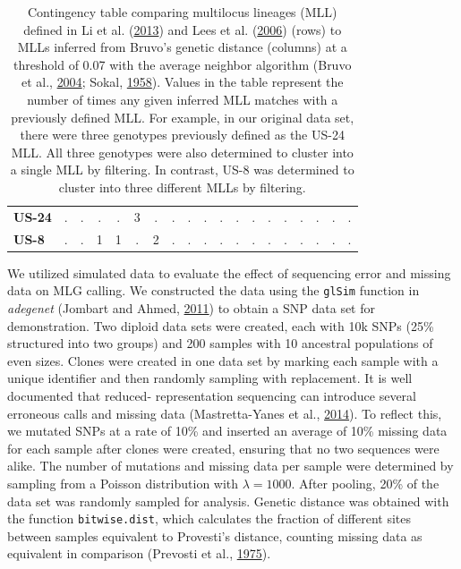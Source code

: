 \documentclass[double,12pt]{beavtex}
\begin{document}
\begin{table}
\begin{tabular}{l|cccccccccccccccccc}
    \textbf{US-24} & . & . & . & . & 3 & . & . & . & . & . & . & . & . & . & . & . & . & . \\ 
    \textbf{US-8} & . & . & 1 & 1 & . & 2 & . & . & . & . & . & . & . & . & . & . & . & . \\ 
     \bottomrule
  \end{tabular}
  \caption[Contingency table comparing multilocus lineages (MLL)]{Contingency table comparing multilocus lineages (MLL) defined in Li et
  al. (\protect\hyperlink{ref-li2013efficient}{2013}) and Lees et al.
  (\protect\hyperlink{ref-lees2006novel}{2006}) (rows) to MLLs inferred
  from Bruvo's genetic distance (columns) at a threshold of 0.07 with the
  average neighbor algorithm (Bruvo et al.,
  \protect\hyperlink{ref-bruvo2004simple}{2004}; Sokal,
  \protect\hyperlink{ref-sokal1958statistical}{1958}). Values in the table
  represent the number of times any given inferred MLL matches with a
  previously defined MLL. For example, in our original data set, there
  were three genotypes previously defined as the US-24 MLL. All three
  genotypes were also determined to cluster into a single MLL by
  filtering. In contrast, US-8 was determined to cluster into three
  different MLLs by filtering.} 
  \label{pinftable}
  \end{table}
  
  \newpage
  
  We utilized simulated data to evaluate the effect of sequencing error
  and missing data on MLG calling. We constructed the data using the
  \texttt{glSim} function in \emph{adegenet} (Jombart and Ahmed,
  \protect\hyperlink{ref-jombart2011adegenet}{2011}) to obtain a SNP data
  set for demonstration. Two diploid data sets were created, each with 10k
  SNPs (25\% structured into two groups) and 200 samples with 10 ancestral
  populations of even sizes. Clones were created in one data set by
  marking each sample with a unique identifier and then randomly sampling
  with replacement. It is well documented that reduced- representation
  sequencing can introduce several erroneous calls and missing data
  (Mastretta-Yanes et al.,
  \protect\hyperlink{ref-mastretta2015restriction}{2014}). To reflect
  this, we mutated SNPs at a rate of 10\% and inserted an average of 10\%
  missing data for each sample after clones were created, ensuring that no
  two sequences were alike. The number of mutations and missing data per
  sample were determined by sampling from a Poisson distribution with
  \(\lambda = 1000\). After pooling, 20\% of the data set was randomly
  sampled for analysis. Genetic distance was obtained with the function
  \texttt{bitwise.dist}, which calculates the fraction of different sites
  between samples equivalent to Provesti's distance, counting missing data
  as equivalent in comparison (Prevosti et al.,
  \protect\hyperlink{ref-prevosti1975distances}{1975}).
  
\end{document}
